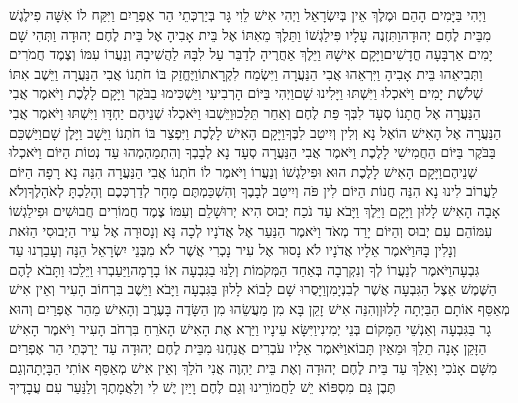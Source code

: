 \documentclass[../main/main.tex]{subfiles}
\begin{document}
\begin{multicols*}{\ncols}
וַיְהִי בַּיָּמִים הָהֵם וּמֶלֶךְ אֵין בְּיִשְׂרָאֵל וַיְהִי אִישׁ לֵוִי גָּר בְּיַרְכְּתֵי הַר אֶפְרַיִם וַיִּקַּח לוֹ אִשָּׁה פִילֶגֶשׁ מִבֵּית לֶחֶם יְהוּדָה\PreVerseSpace{}וַתִּזְנֶה עָלָיו פִּילַגְשׁוֹ וַתֵּלֶךְ מֵאִתּוֹ אֶל בֵּית אָבִיהָ אֶל בֵּית לֶחֶם יְהוּדָה וַתְּהִי שָׁם יָמִים אַרְבָּעָה חֳדָשִׁים\PreVerseSpace{}וַיָּקָם אִישָׁהּ וַיֵּלֶךְ אַחֲרֶיהָ לְדַבֵּר עַל לִבָּהּ לַהֲשִׁיבָהּ\SubEnd{} וְנַעֲרוֹ עִמּוֹ וְצֶמֶד חֲמֹרִים וַתְּבִיאֵהוּ בֵּית אָבִיהָ וַיִּרְאֵהוּ אֲבִי הַנַּעֲרָה וַיִּשְׂמַח לִקְרָאתוֹ\PreVerseSpace{}וַיֶּחֱזַק בּוֹ חֹתְנוֹ אֲבִי הַנַּעֲרָה וַיֵּשֶׁב אִתּוֹ שְׁלֹשֶׁת יָמִים וַיֹּאכְלוּ וַיִּשְׁתּוּ וַיָּלִינוּ שָׁם\PreVerseSpace{}וַיְהִי בַּיּוֹם הָרְבִיעִי וַיַּשְׁכִּימוּ בַבֹּקֶר וַיָּקָם לָלֶכֶת וַיֹּאמֶר אֲבִי הַנַּעֲרָה אֶל חֲתָנוֹ סְעָד לִבְּךָ פַּת לֶחֶם וְאַחַר תֵּלֵכוּ\PreVerseSpace{}וַיֵּשְׁבוּ וַיֹּאכְלוּ שְׁנֵיהֶם יַחְדָּו וַיִּשְׁתּוּ וַיֹּאמֶר אֲבִי הַנַּעֲרָה אֶל הָאִישׁ הוֹאֶל נָא וְלִין וְיִיטַב לִבֶּךָ\PreVerseSpace{}וַיָּקָם הָאִישׁ לָלֶכֶת וַיִּפְצַר בּוֹ חֹתְנוֹ וַיָּשָׁב וַיָּלֶן שָׁם\PreVerseSpace{}וַיַּשְׁכֵּם בַּבֹּקֶר בַּיּוֹם הַחֲמִישִׁי לָלֶכֶת וַיֹּאמֶר אֲבִי הַנַּעֲרָה סְעָד נָא לְבָבְךָ וְהִתְמַהְמְהוּ עַד נְטוֹת הַיּוֹם וַיֹּאכְלוּ שְׁנֵיהֶם\PreVerseSpace{}וַיָּקָם הָאִישׁ לָלֶכֶת הוּא וּפִילַגְשׁוֹ וְנַעֲרוֹ וַיֹּאמֶר לוֹ חֹתְנוֹ אֲבִי הַנַּעֲרָה הִנֵּה נָא רָפָה הַיּוֹם לַעֲרוֹב לִינוּ נָא הִנֵּה חֲנוֹת הַיּוֹם לִין פֹּה וְיִיטַב לְבָבֶךָ וְהִשְׁכַּמְתֶּם מָחָר לְדַרְכְּכֶם וְהָלַכְתָּ לְאֹהָלֶךָ\PreVerseSpace{}וְלֹא אָבָה הָאִישׁ לָלוּן וַיָּקָם וַיֵּלֶךְ וַיָּבֹא עַד נֹכַח יְבוּס הִיא יְרוּשָׁלֵם וְעִמּוֹ צֶמֶד חֲמוֹרִים חֲבוּשִׁים וּפִילַגְשׁוֹ עִמּוֹ\PreVerseSpace{}הֵם עִם יְבוּס וְהַיּוֹם יָרַד\SubEnd{} מְאֹד וַיֹּאמֶר הַנַּעַר אֶל אֲדֹנָיו לְכָה נָּא וְנָסוּרָה אֶל עִיר הַיְבוּסִי הַזֹּאת וְנָלִין בָּהּ\PreVerseSpace{}וַיֹּאמֶר אֵלָיו אֲדֹנָיו לֹא נָסוּר אֶל עִיר נָכְרִי אֲשֶׁר לֹא מִבְּנֵי יִשְׂרָאֵל הֵנָּה וְעָבַרְנוּ עַד גִּבְעָה\PreVerseSpace{}וַיֹּאמֶר לְנַעֲרוֹ לְךָ וְנִקְרְבָה בְּאַחַד הַמְּקֹמוֹת וְלַנּוּ בַגִּבְעָה אוֹ בָרָמָה\PreVerseSpace{}וַיַּעַבְרוּ וַיֵּלֵכוּ וַתָּבֹא לָהֶם הַשֶּׁמֶשׁ אֵצֶל הַגִּבְעָה אֲשֶׁר לְבִנְיָמִן\PreVerseSpace{}וַיָּסֻרוּ שָׁם לָבוֹא לָלוּן בַּגִּבְעָה וַיָּבֹא וַיֵּשֶׁב בִּרְחוֹב הָעִיר וְאֵין אִישׁ מְאַסֵּף אוֹתָם הַבַּיְתָה לָלוּן\PreVerseSpace{}וְהִנֵּה אִישׁ זָקֵן בָּא מִן מַעֲשֵׂהוּ מִן הַשָּׂדֶה בָּעֶרֶב וְהָאִישׁ מֵהַר אֶפְרַיִם וְהוּא גָר בַּגִּבְעָה וְאַנְשֵׁי הַמָּקוֹם בְּנֵי יְמִינִי\PreVerseSpace{}וַיִּשָּׂא עֵינָיו וַיַּרְא אֶת הָאִישׁ הָאֹרֵחַ בִּרְחֹב הָעִיר וַיֹּאמֶר הָאִישׁ הַזָּקֵן אָנָה תֵלֵךְ וּמֵאַיִן תָּבוֹא\PreVerseSpace{}וַיֹּאמֶר אֵלָיו עֹבְרִים אֲנַחְנוּ מִבֵּית לֶחֶם יְהוּדָה עַד יַרְכְּתֵי הַר אֶפְרַיִם מִשָּׁם אָנֹכִי וָאֵלֵךְ עַד בֵּית לֶחֶם יְהוּדָה וְאֶת בֵּית יַהְוֶה אֲנִי הֹלֵךְ וְאֵין אִישׁ מְאַסֵּף אוֹתִי הַבָּיְתָה\PreVerseSpace{}וְגַם תֶּבֶן גַּם מִסְפּוֹא יֵשׁ לַחֲמוֹרֵינוּ וְגַם לֶחֶם וָיַיִן יֶשׁ לִי וְלַאֲמָתֶךָ וְלַנַּעַר עִם עֲבָדֶיךָ 
\end{multicols*}
\end{document}
